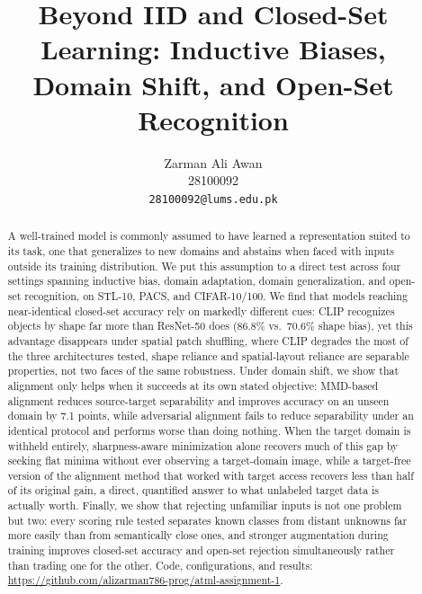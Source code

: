 \documentclass{article}
\title{Beyond IID and Closed-Set Learning: Inductive Biases, Domain Shift, and Open-Set Recognition}
\author{%
  Zarman Ali Awan \\
  28100092 \\
  \texttt{28100092@lums.edu.pk}
}
\begin{document}
\maketitle
\renewcommand{\arraystretch}{0.7}
\setlength{\textfloatsep}{6pt plus 2pt minus 2pt}
\setlength{\floatsep}{4pt plus 2pt minus 2pt}
\setlength{\intextsep}{4pt plus 2pt minus 2pt}
\setlength{\abovecaptionskip}{3pt}
\setlength{\belowcaptionskip}{2pt}
\setlength{\tabcolsep}{3.5pt}

\begin{abstract}
A well-trained model is commonly assumed to have learned a representation suited to its task, one that generalizes to new domains and abstains when faced with inputs outside its training distribution. We put this assumption to a direct test across four settings spanning inductive bias, domain adaptation, domain generalization, and open-set recognition, on STL-10, PACS, and CIFAR-10/100. We find that models reaching near-identical closed-set accuracy rely on markedly different cues: CLIP recognizes objects by shape far more than ResNet-50 does (86.8\% vs.\ 70.6\% shape bias), yet this advantage disappears under spatial patch shuffling, where CLIP degrades the most of the three architectures tested, shape reliance and spatial-layout reliance are separable properties, not two faces of the same robustness. Under domain shift, we show that alignment only helps when it succeeds at its own stated objective: MMD-based alignment reduces source-target separability and improves accuracy on an unseen domain by 7.1 points, while adversarial alignment fails to reduce separability under an identical protocol and performs worse than doing nothing. When the target domain is withheld entirely, sharpness-aware minimization alone recovers much of this gap by seeking flat minima without ever observing a target-domain image, while a target-free version of the alignment method that worked with target access recovers less than half of its original gain, a direct, quantified answer to what unlabeled target data is actually worth. Finally, we show that rejecting unfamiliar inputs is not one problem but two: every scoring rule tested separates known classes from distant unknowns far more easily than from semantically close ones, and stronger augmentation during training improves closed-set accuracy and open-set rejection simultaneously rather than trading one for the other. Code, configurations, and results: \url{https://github.com/alizarman786-prog/atml-assignment-1}.
\end{abstract}
\end{document}
